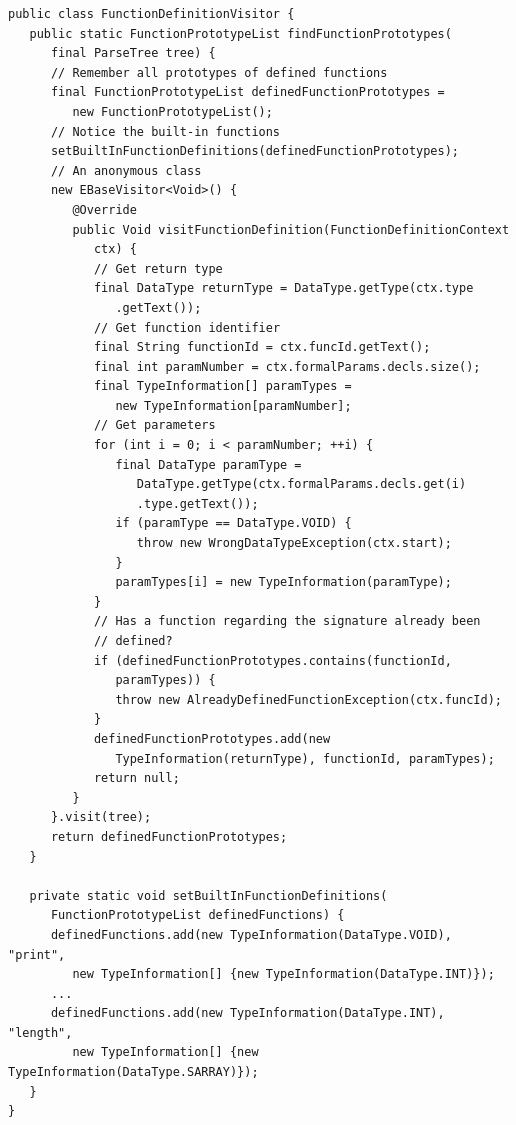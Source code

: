 \begin{lstlisting}[frame=htrbl, caption={Implementation of {\ttfamily FunctionDefinitionVisitor.java}}, label={lst:visitor2}, basicstyle=\footnotesize]
public class FunctionDefinitionVisitor {
   public static FunctionPrototypeList findFunctionPrototypes(
      final ParseTree tree) {
      // Remember all prototypes of defined functions
      final FunctionPrototypeList definedFunctionPrototypes = 
         new FunctionPrototypeList();
      // Notice the built-in functions
      setBuiltInFunctionDefinitions(definedFunctionPrototypes);
      // An anonymous class
      new EBaseVisitor<Void>() {
         @Override
         public Void visitFunctionDefinition(FunctionDefinitionContext 
            ctx) {
            // Get return type
            final DataType returnType = DataType.getType(ctx.type
               .getText());
            // Get function identifier
            final String functionId = ctx.funcId.getText();
            final int paramNumber = ctx.formalParams.decls.size();
            final TypeInformation[] paramTypes = 
               new TypeInformation[paramNumber];
            // Get parameters
            for (int i = 0; i < paramNumber; ++i) {
               final DataType paramType =
                  DataType.getType(ctx.formalParams.decls.get(i)
                  .type.getText());
               if (paramType == DataType.VOID) {
                  throw new WrongDataTypeException(ctx.start);
               }
               paramTypes[i] = new TypeInformation(paramType);
            }
            // Has a function regarding the signature already been 
            // defined?
            if (definedFunctionPrototypes.contains(functionId, 
               paramTypes)) {
               throw new AlreadyDefinedFunctionException(ctx.funcId);
            }
            definedFunctionPrototypes.add(new 
               TypeInformation(returnType), functionId, paramTypes);
            return null;
         }
      }.visit(tree);
      return definedFunctionPrototypes;
   }
   
   private static void setBuiltInFunctionDefinitions(
      FunctionPrototypeList definedFunctions) {
      definedFunctions.add(new TypeInformation(DataType.VOID), "print", 
         new TypeInformation[] {new TypeInformation(DataType.INT)});
      ...
      definedFunctions.add(new TypeInformation(DataType.INT), "length",
         new TypeInformation[] {new TypeInformation(DataType.SARRAY)});
   }
}
\end{lstlisting}

